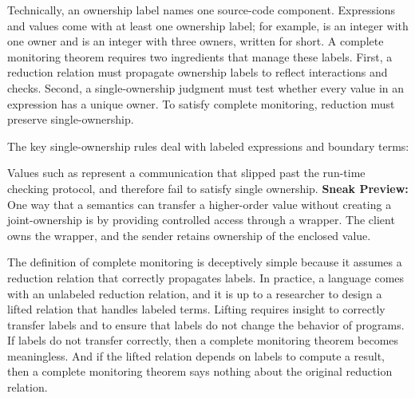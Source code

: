 \documentclass[ twoside,open=right,titlepage,numbers=noenddot,headinclude,%
                footinclude=true,cleardoublepage=empty,abstract=off,
                BCOR=5mm,paper=a4,fontsize=11pt,%
                ngerman,american,%
                parts,pdfspacing]{scrreprt}
\begin{document}
Technically, an ownership label  names one source{-}code component.
Expressions and values come with at least one ownership label;
 for example,  is an integer with one owner
 and  is an
 integer with three owners, written  for short.
A complete monitoring theorem requires two ingredients that manage these labels.
First, a reduction relation \relax{$\samplerred$}
 must propagate ownership labels to reflect interactions and checks.
Second, a single{-}ownership judgment \relax{$\sWL$} must test whether every value in an
 expression has a unique owner.
To satisfy complete monitoring, reduction must preserve single{-}ownership.

The key single{-}ownership rules deal with labeled expressions and boundary terms:


\noindent{}Values such as 
 represent a communication that slipped past the run{-}time checking protocol,
 and therefore fail to satisfy single ownership.
\textbf{Sneak Preview:} One way that a semantics can transfer a higher{-}order value
without creating a joint{-}ownership is by providing controlled access through
a wrapper.
The client owns the wrapper, and the sender retains ownership of the enclosed value.


The definition of complete monitoring is deceptively simple because it assumes
 a reduction relation that correctly propagates labels.
In practice, a language comes with an unlabeled reduction relation,
 and it is up to a researcher to design a lifted relation that handles labeled terms.
Lifting requires insight to correctly transfer labels
 and to ensure that labels do not change the behavior of programs.
If labels do not transfer correctly, then a complete monitoring theorem becomes
 meaningless.
And if the lifted relation depends on labels to compute a result, then
 a complete monitoring theorem says nothing about the original reduction relation.
\end{document}
